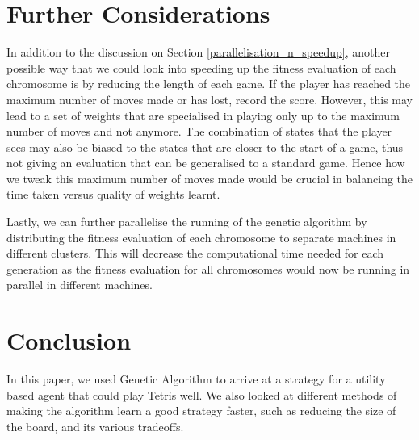 \documentclass[a4paper,12pt,twocolumn]{article}
\begin{document}
\section{Further Considerations}

In addition to the discussion on Section \ref{parallelisation_n_speedup},
another possible way that we could look into speeding up the fitness evaluation
of each chromosome is by reducing the length of each game. If the player has reached
the maximum number of moves made or has lost, record the score. However, this may
lead to a set of weights that are specialised in playing only up to the maximum
number of moves and not anymore. The combination of states that the player sees may
also be biased to the states that are closer to the start of a game, thus not
giving an evaluation that can be generalised to a standard game. Hence how we
tweak this maximum number of moves made would be crucial in balancing the
time taken versus quality of weights learnt.

Lastly, we can further parallelise the running of the genetic algorithm by distributing
the fitness evaluation of each chromosome to separate machines in different
clusters. This will decrease the computational time needed for each generation as the
fitness evaluation for all chromosomes would now be running in parallel in different
machines.

\section{Conclusion}
In this paper, we used Genetic Algorithm to arrive at a strategy for a utility based
agent that could play Tetris well. We also looked at different methods of making
the algorithm learn a good strategy faster, such as reducing the size of the board,
and its various tradeoffs.

\end{document}
